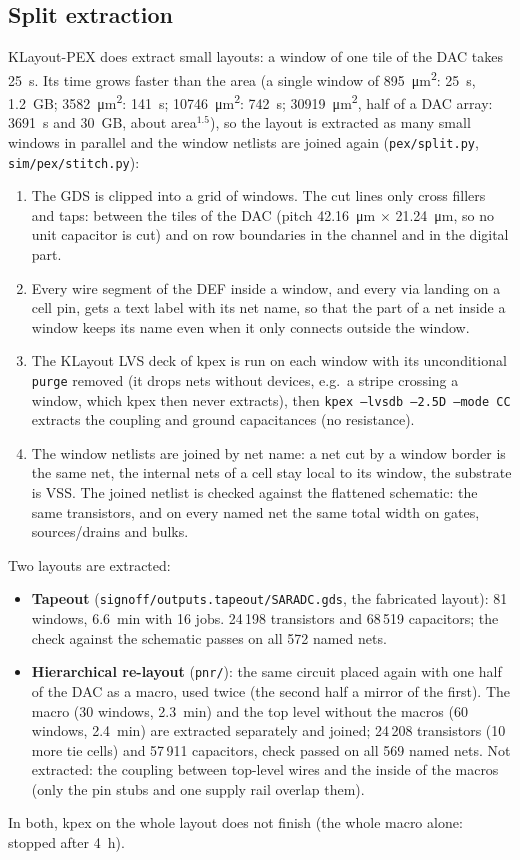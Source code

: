 \documentclass[10pt,a4paper]{article}
\begin{document}
\subsection{Split extraction}
\label{sec:split}
KLayout-PEX does extract small layouts: a window of one tile of the DAC takes \SI{25}{s}. Its time
grows faster than the area (a single window of \SI{895}{\micro m^2}: \SI{25}{s}, \SI{1.2}{GB};
\SI{3582}{\micro m^2}: \SI{141}{s}; \SI{10746}{\micro m^2}: \SI{742}{s}; \SI{30919}{\micro m^2}, half
of a DAC array: \SI{3691}{s} and \SI{30}{GB}, about area$^{1.5}$), so the layout is extracted as many
small windows in parallel and the window netlists are joined again (\texttt{pex/split.py},
\texttt{sim/pex/stitch.py}):
\begin{enumerate}
  \item The GDS is clipped into a grid of windows. The cut lines only cross fillers and taps: between the
        tiles of the DAC (pitch \SI{42.16}{\micro m} $\times$ \SI{21.24}{\micro m}, so no unit capacitor is
        cut) and on row boundaries in the channel and in the digital part.
  \item Every wire segment of the DEF inside a window, and every via landing on a cell pin, gets a text
        label with its net name, so that the part of a net inside a window keeps its name even when it
        only connects outside the window.
  \item The KLayout LVS deck of kpex is run on each window with its unconditional \texttt{purge}
        removed (it drops nets without devices, e.g.\ a stripe crossing a window, which kpex then never
        extracts), then \texttt{kpex --lvsdb --2.5D --mode CC} extracts the coupling and ground
        capacitances (no resistance).
  \item The window netlists are joined by net name: a net cut by a window border is the same net,
        the internal nets of a cell stay local to its window, the substrate is VSS. The joined netlist is
        checked against the flattened schematic: the same transistors, and on every named net the same
        total width on gates, sources/drains and bulks.
\end{enumerate}
Two layouts are extracted:
\begin{itemize}
  \item \textbf{Tapeout} (\texttt{signoff/outputs.tapeout/SARADC.gds}, the fabricated layout): 81
        windows, \SI{6.6}{min} with 16 jobs. 24\,198 transistors and 68\,519 capacitors; the check against
        the schematic passes on all 572 named nets.
  \item \textbf{Hierarchical re-layout} (\texttt{pnr/}): the same circuit placed again with one half of
        the DAC as a macro, used twice (the second half a mirror of the first). The macro (30 windows,
        \SI{2.3}{min}) and the top level without the macros (60 windows, \SI{2.4}{min}) are extracted
        separately and joined; 24\,208 transistors (10 more tie cells) and 57\,911 capacitors, check passed on
        all 569 named nets. Not extracted: the coupling between top-level wires and the inside of the
        macros (only the pin stubs and one supply rail overlap them).
\end{itemize}
In both, kpex on the whole layout does not finish (the whole macro alone: stopped after \SI{4}{h}).





\end{document}
